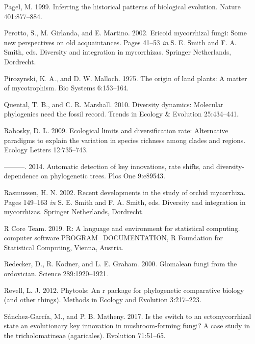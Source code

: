 \documentclass[
  12pt,
]{article}
\newenvironment{cslreferences}%
  {}%
  {\par}
\begin{document}
\begin{cslreferences}
\leavevmode\hypertarget{ref-pagel_1999}{}%
Pagel, M. 1999. Inferring the historical patterns of biological
evolution. Nature 401:877--884.

\leavevmode\hypertarget{ref-perotto_2002}{}%
Perotto, S., M. Girlanda, and E. Martino. 2002. Ericoid mycorrhizal
fungi: Some new perspectives on old acquaintances. Pages 41--53
\emph{in} S. E. Smith and F. A. Smith, eds. Diversity and integration in
mycorrhizas. Springer Netherlands, Dordrecht.

\leavevmode\hypertarget{ref-pirozynski_1975}{}%
Pirozynski, K. A., and D. W. Malloch. 1975. The origin of land plants: A
matter of mycotrophism. Bio Systems 6:153--164.

\leavevmode\hypertarget{ref-quental_2010}{}%
Quental, T. B., and C. R. Marshall. 2010. Diversity dynamics: Molecular
phylogenies need the fossil record. Trends in Ecology \& Evolution
25:434--441.

\leavevmode\hypertarget{ref-rabosky_2009}{}%
Rabosky, D. L. 2009. Ecological limits and diversification rate:
Alternative paradigms to explain the variation in species richness among
clades and regions. Ecology Letters 12:735--743.

\leavevmode\hypertarget{ref-rabosky_2014}{}%
---------. 2014. Automatic detection of key innovations, rate shifts,
and diversity-dependence on phylogenetic trees. Plos One 9:e89543.

\leavevmode\hypertarget{ref-rasmussen_2002}{}%
Rasmussen, H. N. 2002. Recent developments in the study of orchid
mycorrhiza. Pages 149--163 \emph{in} S. E. Smith and F. A. Smith, eds.
Diversity and integration in mycorrhizas. Springer Netherlands,
Dordrecht.

\leavevmode\hypertarget{ref-rcoreteam_software_2019}{}%
R Core Team. 2019. R: A language and environment for statistical
computing. computer software.PROGRAM\_DOCUMENTATION, R Foundation for
Statistical Computing, Vienna, Austria.

\leavevmode\hypertarget{ref-redecker_2000}{}%
Redecker, D., R. Kodner, and L. E. Graham. 2000. Glomalean fungi from
the ordovician. Science 289:1920--1921.

\leavevmode\hypertarget{ref-revell_2012}{}%
Revell, L. J. 2012. Phytools: An r package for phylogenetic comparative
biology (and other things). Methods in Ecology and Evolution 3:217--223.

\leavevmode\hypertarget{ref-snchezgarca_2017}{}%
Sánchez-García, M., and P. B. Matheny. 2017. Is the switch to an
ectomycorrhizal state an evolutionary key innovation in mushroom-forming
fungi? A case study in the tricholomatineae (agaricales). Evolution
71:51--65.


\end{cslreferences}
\end{document}
